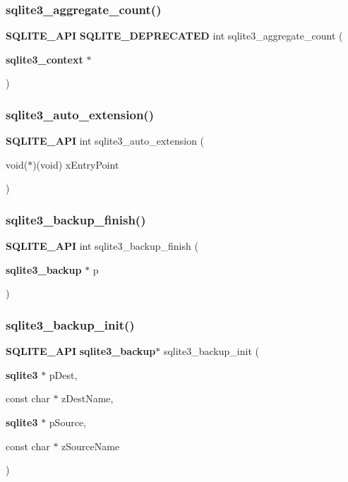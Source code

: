 \subsubsection{sqlite3\_aggregate\_count()}
{\footnotesize\ttfamily \textbf{ S\+Q\+L\+I\+T\+E\+\_\+\+A\+PI} \textbf{ S\+Q\+L\+I\+T\+E\+\_\+\+D\+E\+P\+R\+E\+C\+A\+T\+ED} int sqlite3\+\_\+aggregate\+\_\+count (\begin{DoxyParamCaption}\item[{\textbf{ sqlite3\+\_\+context} $\ast$}]{ }\end{DoxyParamCaption})}

\mbox{\label{sqlite3_8h_a85a95b45e94f6bcd52aa39b6acdb36d7}} 
\subsubsection{sqlite3\_auto\_extension()}
{\footnotesize\ttfamily \textbf{ S\+Q\+L\+I\+T\+E\+\_\+\+A\+PI} int sqlite3\+\_\+auto\+\_\+extension (\begin{DoxyParamCaption}\item[{void($\ast$)(void)}]{x\+Entry\+Point }\end{DoxyParamCaption})}

\mbox{\label{sqlite3_8h_a176857dd58d99be53b6d7305533e0048}} 
\subsubsection{sqlite3\_backup\_finish()}
{\footnotesize\ttfamily \textbf{ S\+Q\+L\+I\+T\+E\+\_\+\+A\+PI} int sqlite3\+\_\+backup\+\_\+finish (\begin{DoxyParamCaption}\item[{\textbf{ sqlite3\+\_\+backup} $\ast$}]{p }\end{DoxyParamCaption})}

\mbox{\label{sqlite3_8h_a9c9aa9e8edeb9910d93148a6621c1097}} 
\subsubsection{sqlite3\_backup\_init()}
{\footnotesize\ttfamily \textbf{ S\+Q\+L\+I\+T\+E\+\_\+\+A\+PI} \textbf{ sqlite3\+\_\+backup}$\ast$ sqlite3\+\_\+backup\+\_\+init (\begin{DoxyParamCaption}\item[{\textbf{ sqlite3} $\ast$}]{p\+Dest,  }\item[{const char $\ast$}]{z\+Dest\+Name,  }\item[{\textbf{ sqlite3} $\ast$}]{p\+Source,  }\item[{const char $\ast$}]{z\+Source\+Name }\end{DoxyParamCaption})}

